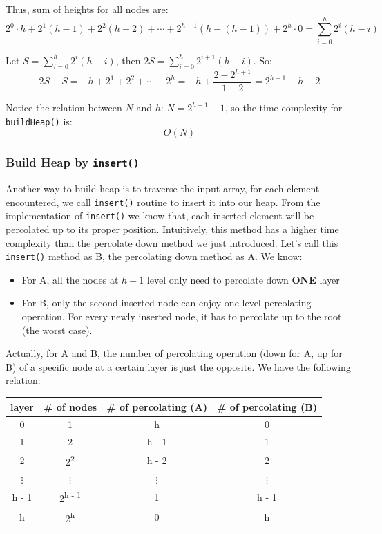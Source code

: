 \documentclass[12pt]{book}
\begin{document}
Thus, sum of heights for all nodes are:
\[
2^0 \cdot h + 2^1(h - 1) + 2^2(h - 2) + \cdots + 2^{h - 1}(h - (h - 1)) + 2^h \cdot 0 = \sum_{i = 0}^{h}2^i(h - i)
\]

Let \(S = \sum_{i = 0}^{h}2^i(h - i)\), then \(2S = \sum_{i = 0}^{h}2^{i + 1}(h - i)\). So:
\[
2S - S = -h + 2^1 + 2^2 + \cdots + 2^h = -h + \frac {2 - 2^{h + 1}} {1 - 2}
= 2^{h + 1} - h - 2
\]

Notice the relation between \(N\) and \(h\): \(N = 2^{h + 1} - 1\), so the time complexity for \texttt{buildHeap()} is:
\[
O(N)
\]
\subsubsection{Build Heap by \texttt{insert()}}
\label{sec:org90fb5e4}
Another way to build heap is to traverse the input array, for each element encountered, we call \texttt{insert()} routine to insert it into our heap. From the implementation of \texttt{insert()} we know that, each inserted element will be percolated up to its proper position. Intuitively, this method has a higher time complexity than the percolate down method we just introduced. Let's call this \texttt{insert()} method as B, the percolating down method as A. We know:
\begin{itemize}
\item For A, all the nodes at \(h - 1\) level only need to percolate down \textbf{ONE} layer
\item For B, only the second inserted node can enjoy one-level-percolating operation. For every newly inserted node, it has to percolate up to the root (the worst case).
\end{itemize}

Actually, for A and B, the number of percolating operation (down for A, up for B) of a specific node at a certain layer is just the opposite. We have the following relation:
\begin{center}
\begin{tabular}{cccc}
\hline
layer & \# of nodes & \# of percolating (A) & \# of percolating (B)\\
\hline
0 & 1 & h & 0\\
1 & 2 & h - 1 & 1\\
2 & 2\textsuperscript{2} & h - 2 & 2\\
\(\vdots\) & \(\vdots\) & \(\vdots\) & \(\vdots\)\\
h - 1 & 2\textsuperscript{h - 1} & 1 & h - 1\\
h & 2\textsuperscript{h} & 0 & h\\
\hline
\end{tabular}
\end{center}
\end{document}
